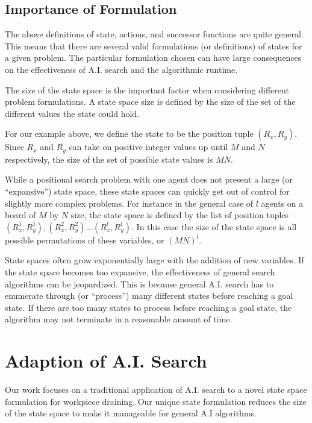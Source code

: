 	\subsection{Importance of Formulation}

The above definitions of state, actions, and successor functions are quite general. This means that there are several valid formulations (or definitions) of states for a given problem. The particular formulation chosen can have large consequences on the effectiveness of A.I. search and the algorithmic runtime.


The size of the state space is the important factor when considering different problem formulations. A state space size is defined by the size of the set of the different values the state could hold.

For our example above, we define the state to be the position tuple $(R_x, R_y)$. Since $R_x$ and $R_y$ can take on positive integer values up until $M$ and $N$ respectively, the size of the set of possible state values is $MN$.

While a positional search problem with one agent does not present a large (or ``expansive'') state space, these state spaces can quickly get out of control for slightly more complex problems. For instance in the general case of $l$ agents on a board of $M$ by $N$ size, the state space is defined by the list of position tuples $(R^1_x, R^1_y), (R^2_x, R^2_y)... (R^l_x, R^l_y)$. In this case the size of the state space is all possible permutations of these variables, or $(MN)^l$.

State spaces often grow exponentially large with the addition of new variables. If the state space becomes too expansive, the effectiveness of general search algorithms can be jeopardized. This is because general A.I. search has to enumerate through (or ``process'') many different states before reaching a goal state. If there are too many states to process before reaching a goal state, the algorithm may not terminate in a reasonable amount of time.

\section{Adaption of A.I. Search}

Our work focuses on a traditional application of A.I. search to a novel state space formulation for workpiece draining. Our unique state formulation reduces the size of the state space to make it manageable for general A.I algorithms.

